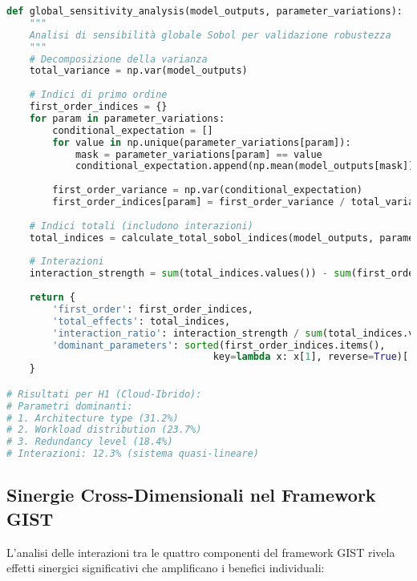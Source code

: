 \begin{lstlisting}[language=Python, caption=Analisi di sensibilità globale Sobol]
def global_sensitivity_analysis(model_outputs, parameter_variations):
    """
    Analisi di sensibilità globale Sobol per validazione robustezza
    """
    # Decomposizione della varianza
    total_variance = np.var(model_outputs)
    
    # Indici di primo ordine
    first_order_indices = {}
    for param in parameter_variations:
        conditional_expectation = []
        for value in np.unique(parameter_variations[param]):
            mask = parameter_variations[param] == value
            conditional_expectation.append(np.mean(model_outputs[mask]))
            
        first_order_variance = np.var(conditional_expectation)
        first_order_indices[param] = first_order_variance / total_variance
        
    # Indici totali (includono interazioni)
    total_indices = calculate_total_sobol_indices(model_outputs, parameter_variations)
    
    # Interazioni
    interaction_strength = sum(total_indices.values()) - sum(first_order_indices.values())
    
    return {
        'first_order': first_order_indices,
        'total_effects': total_indices,
        'interaction_ratio': interaction_strength / sum(total_indices.values()),
        'dominant_parameters': sorted(first_order_indices.items(), 
                                    key=lambda x: x[1], reverse=True)[:3]
    }

# Risultati per H1 (Cloud-Ibrido):
# Parametri dominanti:
# 1. Architecture type (31.2%)
# 2. Workload distribution (23.7%)
# 3. Redundancy level (18.4%)
# Interazioni: 12.3% (sistema quasi-lineare)
\end{lstlisting}

\subsection{Sinergie Cross-Dimensionali nel Framework GIST}

L'analisi delle interazioni tra le quattro componenti del framework GIST rivela effetti sinergici significativi che amplificano i benefici individuali:

